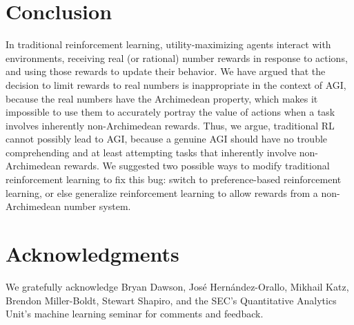 \documentclass[twoside,11pt]{article}
\begin{document}


\section{Conclusion}
\label{conclusionsection}

In traditional reinforcement learning, utility-maximizing agents interact
with environments, receiving real (or rational) number rewards in response to
actions, and using those rewards to update their behavior. We have argued that
the decision to limit rewards to real numbers is inappropriate in the context
of AGI, because the real numbers have the Archimedean property, which makes it
impossible to use them to accurately portray the value of actions when a task
involves inherently non-Archimedean rewards. Thus, we argue, traditional
RL cannot possibly lead to AGI, because a genuine AGI should have no trouble
comprehending and at least attempting tasks that inherently involve
non-Archimedean rewards. We suggested two possible ways
to modify traditional reinforcement learning to fix this bug: switch to
preference-based reinforcement learning, or else generalize reinforcement learning
to allow rewards from a non-Archimedean number system.

\section*{Acknowledgments}

We gratefully acknowledge Bryan Dawson, Jos{\'e} Hern{\'a}ndez-Orallo,
Mikhail Katz,
Brendon Miller-Boldt, Stewart Shapiro, and the
SEC's Quantitative Analytics Unit's machine learning seminar
for comments and feedback.

%

\end{document}
